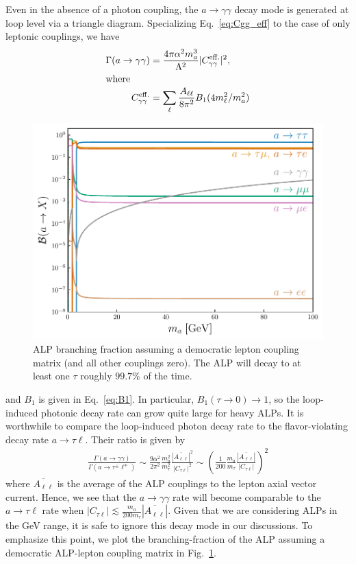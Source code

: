 Even in the absence of a photon coupling, the $a\rightarrow \gamma\gamma$ decay mode is generated at loop level via a triangle diagram. Specializing  Eq.~\ref{eq:Cgg_eff} to the case of only leptonic couplings, we have
\begin{align}
    \Gamma(a\rightarrow \gamma\gamma) &= \frac{4\pi \alpha^2 m_a^3}{\Lambda^2}|C_{\gamma\gamma}^{\rm eff.}|^2,\\
\intertext{where}
    C_{\gamma\gamma}^{\rm eff.} &= \sum_{\ell}\frac{A_{\ell\ell}}{8\pi^2}B_1(4m_\ell^2/m_a^2)
\end{align}
\begin{figure}[t!]
    \centering
    \includegraphics[width=0.7\linewidth]{figures/chapter5/LFV_ALP_branching_fraction.pdf}
    \caption[ALP branching fraction assuming a democratic lepton coupling matrix.]{ALP branching fraction assuming a democratic lepton coupling matrix (and all other couplings zero). The ALP will decay to at least one $\tau$ roughly $99.7\%$ of the time.}
    \label{fig:LFV_ALP_branching_fraction}
\end{figure}
and $B_1$ is given in Eq.~\ref{eq:B1}. In particular, $B_1(\tau \rightarrow 0)\rightarrow 1$, so the loop-induced photonic decay rate can grow quite large for heavy ALPs. It is worthwhile to compare the loop-induced photon decay rate to the flavor-violating decay rate $a \rightarrow \tau \ell$. Their ratio is given by
\begin{align}
\frac{\Gamma(a\rightarrow\gamma\gamma)}{\Gamma(a\rightarrow\tau^\pm\ell^\mp)} \sim  \frac{9\alpha^2}{2\pi^2}\frac{m_a^2}{m_\tau^2}\frac{|\overline{A_{\ell\ell}}|^2}{|C_{\tau \ell}|^2} \sim \left(\frac{1}{200}\frac{m_a}{m_\tau}\frac{|\overline{A_{\ell\ell}}|}{|C_{\tau\ell}|}\right)^2
\end{align}
where $\overline{A_{\ell\ell}}$ is the average of the ALP couplings to the lepton axial vector current. Hence, we see that the $a\rightarrow \gamma\gamma$ rate will become comparable to the $a\rightarrow \tau \ell$ rate when $|C_{\tau \ell}| \lesssim \frac{m_a}{200m_\tau}|\overline{A_{\ell\ell}}| $. Given that we are considering ALPs in the GeV range, it is safe to ignore this decay mode in our discussions. To emphasize this point, we plot the branching-fraction of the ALP assuming a democratic ALP-lepton coupling matrix in Fig.~\ref{fig:LFV_ALP_branching_fraction}.

